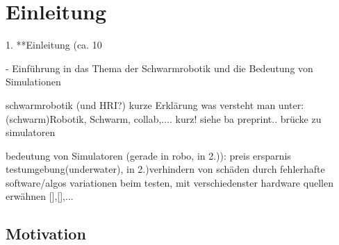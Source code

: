 \documentclass[german,version-2020-11]{uzl-thesis}
\begin{document}
%
%


\chapter{Einleitung}


%


   
1. **Einleitung (ca. 10%

  - Einführung in das Thema der Schwarmrobotik und die Bedeutung von Simulationen
      
      schwarmrobotik (und HRI?)
        kurze Erklärung
          was versteht man unter: (schwarm)Robotik, Schwarm, collab,.... kurz!
          siehe ba preprint..
        brücke zu simulatoren
      
      
      bedeutung von Simulatoren (gerade in robo, in 2.)):
        preis ersparnis  testumgebung(underwater), 
        in 2.)verhindern von schäden durch fehlerhafte software/algos
        variationen beim testen, mit verschiedenster hardware  
        quellen erwähnen [],[],...



      


      
   





\section{Motivation}
\end{document}
